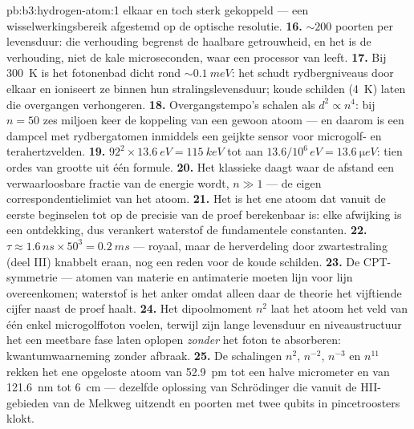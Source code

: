 \begin{solution}{pb:b3:hydrogen-atom:1}
elkaar en toch sterk gekoppeld --- een wisselwerkingsbereik afgestemd op
de optische resolutie.
\textbf{16.} $\sim 200$ poorten per levensduur: die verhouding begrenst
de haalbare getrouwheid, en het is de verhouding, niet de kale
microseconden, waar een processor van leeft.
\textbf{17.} Bij \qty{300}{K} is het fotonenbad dicht rond
$\sim\qty{0.1}{meV}$: het schudt rydbergniveaus door elkaar en ioniseert
ze binnen hun stralingslevensduur; koude schilden (\qty{4}{K}) laten die
overgangen verhongeren.
\textbf{18.} Overgangstempo's schalen als $d^2 \propto n^4$: bij $n =
50$
zes miljoen keer de koppeling van een gewoon atoom --- en daarom is een
dampcel met rydbergatomen inmiddels een geijkte sensor voor microgolf- en
terahertzvelden.
\textbf{19.} $92^2 \times \qty{13.6}{eV} = \qty{115}{keV}$ tot aan
$13.6/10^6\,\unit{eV} = \qty{13.6}{\micro eV}$: tien ordes van grootte
uit één formule.
\textbf{20.} Het klassieke daagt waar de afstand een verwaarloosbare
fractie van de energie wordt, $n \gg 1$ --- de eigen correspondentielimiet
van het atoom.
\textbf{21.} Het is het ene atoom dat vanuit de eerste beginselen tot op
de precisie van de proef berekenbaar is: elke afwijking is een ontdekking,
dus verankert waterstof de fundamentele constanten.
\textbf{22.} $\tau \approx 1.6\,\unit{ns} \times 50^3 =
\qty{0.2}{ms}$ --- royaal, maar de herverdeling door zwartestraling (deel
III) knabbelt eraan, nog een reden voor de koude schilden.
\textbf{23.} De CPT-symmetrie --- atomen van materie en antimaterie
moeten lijn voor lijn overeenkomen; waterstof is het anker omdat alleen
daar de theorie het vijftiende cijfer naast de proef haalt.
\textbf{24.} Het dipoolmoment $n^2$ laat het atoom het veld van
één enkel microgolffoton voelen, terwijl zijn lange levensduur en
niveaustructuur het een meetbare fase laten oplopen \emph{zonder} het
foton te absorberen: kwantumwaarneming zonder afbraak.
\textbf{25.} De schalingen $n^2$, $n^{-2}$, $n^{-3}$ en $n^{11}$ rekken
het ene opgeloste atoom van \qty{52.9}{pm} tot een halve micrometer en van
\qty{121.6}{nm} tot \qty{6}{cm} --- dezelfde oplossing van Schrödinger die
vanuit de HII-gebieden van de Melkweg uitzendt en poorten met twee qubits
in pincetroosters klokt.
\end{solution}
